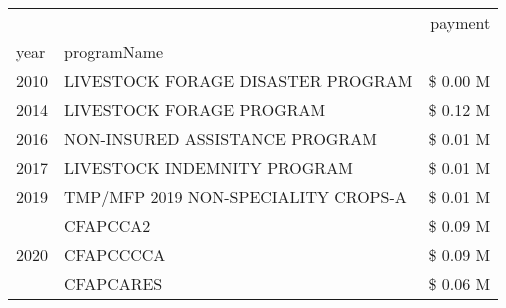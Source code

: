 \begin{tabular}{llr}
\toprule
 &  & payment \\
year & programName &  \\
\midrule
2010 & LIVESTOCK FORAGE DISASTER  PROGRAM & \$ 0.00 M \\
\cline{1-3}
2014 & LIVESTOCK FORAGE PROGRAM & \$ 0.12 M \\
\cline{1-3}
2016 & NON-INSURED ASSISTANCE PROGRAM                & \$ 0.01 M \\
\cline{1-3}
2017 & LIVESTOCK INDEMNITY PROGRAM & \$ 0.01 M \\
\cline{1-3}
2019 & TMP/MFP 2019 NON-SPECIALITY CROPS-A & \$ 0.01 M \\
\cline{1-3}
\multirow[t]{3}{*}{2020} & CFAPCCA2 & \$ 0.09 M \\
 & CFAPCCCCA & \$ 0.09 M \\
 & CFAPCARES & \$ 0.06 M \\
\cline{1-3}
\bottomrule
\end{tabular}
